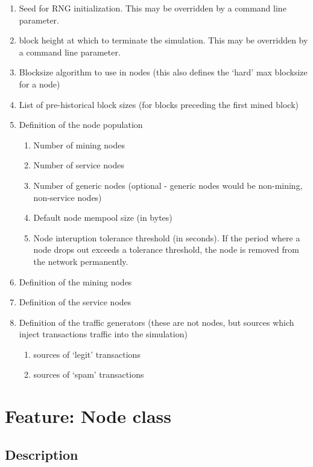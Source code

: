 \documentclass{scrreprt}
\begin{document}
\begin{enumerate}
   \item Seed for RNG initialization. This may be overridden by a command line parameter.
   \item block height at which to terminate the simulation. This may be overridden by a command line parameter.
   \item Blocksize algorithm to use in nodes (this also defines the `hard' max blocksize for a node)
   \item List of pre-historical block sizes (for blocks preceding the first mined block)
   \item Definition of the node population
      \begin{enumerate}
         \item Number of mining nodes
         \item Number of service nodes
         \item Number of generic nodes (optional - generic nodes would be non-mining, non-service nodes)
         \item Default node mempool size (in bytes)
         \item Node interuption tolerance threshold (in seconds). If the period where a node drops out exceeds a tolerance threshold, the node is removed from the network permanently.
      \end{enumerate}
   \item Definition of the mining nodes
   \item Definition of the service nodes
   \item Definition of the traffic generators (these are not nodes, but sources which inject transactions traffic into the simulation)
      \begin{enumerate}
         \item sources of `legit' transactions
         \item sources of `spam' transactions
      \end{enumerate}
\end{enumerate}



\section{Feature: Node class}

\subsection{Description}
\end{document}
